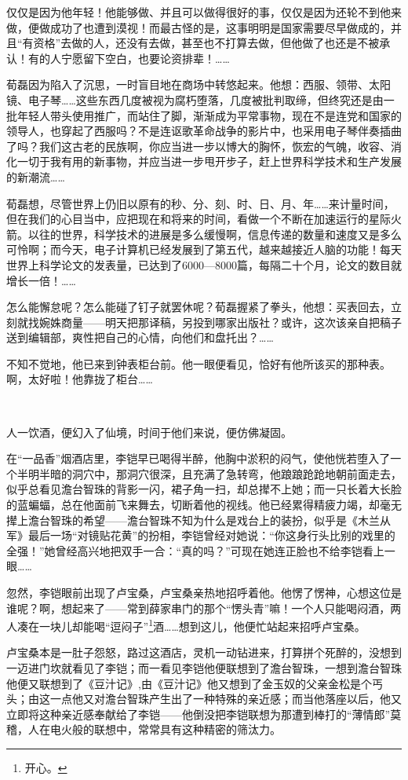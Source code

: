 \par 仅仅是因为他年轻！他能够做、并且可以做得很好的事，仅仅是因为还轮不到他来做，便做成功了也遭到漠视！而最古怪的是，这事明明是国家需要尽早做成的，并且“有资格”去做的人，还没有去做，甚至也不打算去做，但他做了也还是不被承认！有的人宁愿留下空白，也要论资排辈！……
\par 荀磊因为陷入了沉思，一时盲目地在商场中转悠起来。他想：西服、领带、太阳镜、电子琴……这些东西几度被视为腐朽堕落，几度被批判取缔，但终究还是由一批年轻人带头使用推广，而站住了脚，渐渐成为平常事物，现在不是连党和国家的领导人，也穿起了西服吗？不是连讴歌革命战争的影片中，也采用电子琴伴奏插曲了吗？我们这古老的民族啊，你应当进一步以博大的胸怀，恢宏的气魄，收容、消化一切于我有用的新事物，并应当进一步甩开步子，赶上世界科学技术和生产发展的新潮流……
\par 荀磊想，尽管世界上仍旧以原有的秒、分、刻、时、日、月、年……来计量时间，但在我们的心目当中，应把现在和将来的时间，看做一个不断在加速运行的星际火箭。以往的世界，科学技术的进展是多么缓慢啊，信息传递的数量和速度又是多么可怜啊；而今天，电子计算机已经发展到了第五代，越来越接近人脑的功能！每天世界上科学论文的发表量，已达到了6000—8000篇，每隔二十个月，论文的数目就增长一倍！……
\par 怎么能懈怠呢？怎么能碰了钉子就罢休呢？荀磊握紧了拳头，他想：买表回去，立刻就找婉姝商量——明天把那译稿，另投到哪家出版社？或许，这次该亲自把稿子送到编辑部，爽性把自己的心情，向他们和盘托出？……
\par 不知不觉地，他已来到钟表柜台前。他一眼便看见，恰好有他所该买的那种表。啊，太好啦！他靠拢了柜台……
\par  
\par 人一饮酒，便幻入了仙境，时间于他们来说，便仿佛凝固。
\par 在“一品香”烟酒店里，李铠早已喝得半醉，他胸中淤积的闷气，使他恍若堕入了一个半明半暗的洞穴中，那洞穴很深，且充满了急转弯，他踉踉跄跄地朝前面走去，似乎总看见澹台智珠的背影一闪，裙子角一扫，却总撵不上她；而一只长着大长脸的蓝蝙蝠，总在他面前飞来舞去，切断着他的视线。他已经累得精疲力竭，却毫无撵上澹台智珠的希望——澹台智珠不知为什么是戏台上的装扮，似乎是《木兰从军》最后一场“对镜贴花黄”的扮相，李铠曾经对她说：“你这身行头比别的戏里的全强！”她曾经高兴地把双手一合：“真的吗？”可现在她连正脸也不给李铠看上一眼……
\par 忽然，李铠眼前出现了卢宝桑，卢宝桑亲热地招呼着他。他愣了愣神，心想这位是谁呢？啊，想起来了——常到薛家串门的那个“愣头青”嘛！一个人只能喝闷酒，两人凑在一块儿却能喝“逗闷子”\footnote{开心。}酒……想到这儿，他便忙站起来招呼卢宝桑。
\par 卢宝桑本是一肚子怨怒，路过这酒店，灵机一动钻进来，打算拼个死醉的，没想到一迈进门坎就看见了李铠；而一看见李铠他便联想到了澹台智珠，一想到澹台智珠他便又联想到了《豆汁记》,由《豆汁记》他又想到了金玉奴的父亲金松是个丐头；由这一点他又对澹台智珠产生出了一种特殊的亲近感；而当他落座以后，他又立即将这种亲近感奉献给了李铠——他倒没把李铠联想为那遭到棒打的“薄情郎”莫稽，人在电火般的联想中，常常具有这种精密的筛汰力。
